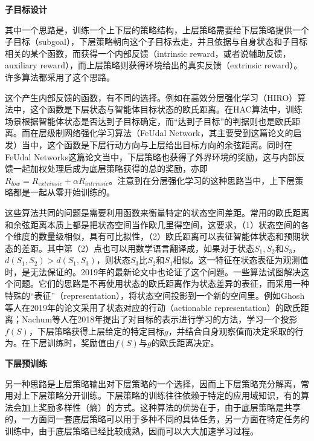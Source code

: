 \textbf{子目标设计}

其中一个思路是，训练一个上下层的策略结构，上层策略需要给下层策略提供一个子目标（subgoal），下层策略朝向这个子目标去走，并且依据与自身状态和子目标相关的某个函数，而获得一个内部反馈（intrinsic reward，或者说辅助反馈，auxiliary reward），而上层策略则获得环境给出的真实反馈（extrinsic reward）。许多算法都采用了这个思路\cite{Sutton:1999}\cite{Tenenbaum2016NIPS}\cite{HIRO}\cite{HAC}\cite{feudal}。

这个产生内部反馈的函数，有不同的选择。例如在高效分层强化学习（HIRO\cite{HIRO}）算法中，这个函数是下层状态与智能体目标状态的欧氏距离。在HAC\cite{HAC}算法中，训练场景根据智能体状态是否达到子目标确定，而``达到子目标''的判据则也是欧氏距离。而在层级制网络强化学习算法（FeUdal Network\cite{feudal}，其主要受到\cite{FUN}这篇论文的启发）当中，这个函数是下层行动方向与上层给出目标方向的余弦距离。同时在FeUdal Networks这篇论文当中，下层策略也获得了外界环境的奖励，这与内部反馈一起加权处理后成为底层策略获得的总的奖励，亦即$R_{low} = R_{extrinsic} + \alpha R_{intrinsic}$。注意到在分层强化学习的这种思路当中，上下层策略都是一起从零开始训练的。

这些算法共同的问题是需要利用函数来衡量特定的状态空间差距。常用的欧氏距离和余弦距离本质上都是把状态空间当作欧几里得空间，这要求，（1）状态空间的各个维度的数量级相似，具有可比拟性，（2）欧氏距离可以表征智能体状态和预期状态的差距。其中第（2）点也可以用数学语言翻译成，如果对于状态$S_1, S_2$和$S_3$，$d(S_1, S_2) > d(S_1, S_3)$，则状态$S_3$比$S_2$和$S_1$相似。这一特征在状态表征为观测值时，是无法保证的。2019年的最新论文\cite{goal-conditioned}中也论证了这个问题。一些算法试图解决这个问题。它们的思路是不再使用状态的欧氏距离作为状态差异的表征，而采用一种特殊的``表征''（representation），将状态空间投影到一个新的空间里。例如Ghosh等人在2019年的论文\cite{goal-conditioned}采用了状态对应的行动（actionable representation）的欧氏距离；Nachum等人在2018年\cite{goal_repr_learning}提出了对目标的表示进行学习的方法，学习一个投影$f(S)$，下层策略获得上层给定的特定目标$g$，并结合自身观察值而决定采取的行为。在下层训练时，奖励值由$f(S)$与$g$的欧氏距离决定。

\textbf{下层预训练}

另一种思路是上层策略输出对下层策略的一个选择，因而上下层策略充分解离，常用对上下层策略分开训练\cite{DIYAN}\cite{SNN4hrl}\cite{Learning_and_Transfer_of_Modulated_Locomotor_Controllers}。下层策略的训练往往依赖于特定的应用域知识，有的算法会加上奖励多样性（熵）的方式。这种算法的优势在于，由于底层策略是共享的，一方面同一套底层策略可以用于多种不同的具体任务，另一方面在特定任务的训练中，由于底层策略已经比较成熟，因而可以大大加速学习过程。

